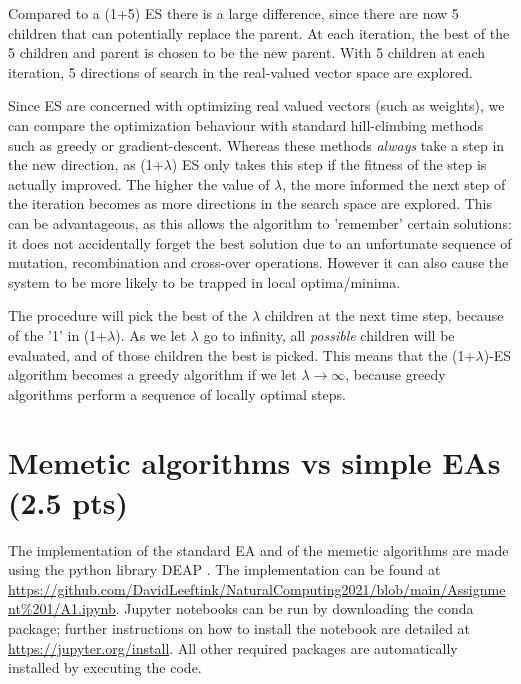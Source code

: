 \documentclass{article}
\begin{document}
Compared to a (1+5) ES there is a large difference, since there are now 5 children that can potentially replace the parent. At each iteration, the best of the 5 children and parent is chosen to be the new parent. With 5 children at each iteration, 5 directions of search in the real-valued vector space are explored.

Since ES are concerned with optimizing real valued vectors (such as weights), we can compare the optimization behaviour with standard hill-climbing methods such as greedy or gradient-descent. Whereas these methods \textit{always} take a step in the new direction, as (1+$\lambda$) ES only takes this step if the fitness of the step is actually improved. The higher the value of $\lambda$, the more informed the next step of the iteration becomes as more directions in the search space are explored. This can be advantageous, as this allows the algorithm to 'remember' certain solutions: it does not accidentally forget the best solution due to an unfortunate sequence of mutation, recombination and cross-over operations. However it can also cause the system to be more likely to be trapped in local optima/minima. 

The procedure will pick the best of the $\lambda$ children at the next time step, because of the '1' in (1+$\lambda$). As we let $\lambda$ go to infinity, all \textit{possible} children will be evaluated, and of those children the best is picked. This means that the (1+$\lambda$)-ES algorithm becomes a greedy algorithm if we let $\lambda \to \infty$, because greedy algorithms perform a sequence of locally optimal steps. 


\section{Memetic algorithms vs simple EAs (2.5 pts)}
The implementation of the standard EA and of the memetic algorithms are made using the python library DEAP \cite{deap}. The implementation can be found at \url{https://github.com/DavidLeeftink/NaturalComputing2021/blob/main/Assignment\%201/A1.ipynb}. Jupyter notebooks can be run by downloading the conda package; further instructions on how to install the notebook are detailed at \url{https://jupyter.org/install}. All other required packages are automatically installed by executing the code.
\end{document}
